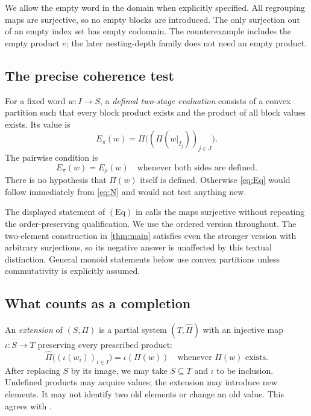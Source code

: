 \documentclass[11pt,letterpaper]{article}
\numberwithin{equation}{section}
\theoremstyle{definition}
\theoremstyle{remark}
\newcommand{\Eq}{\mathrm{Eq}}
\begin{document}
We allow the empty word in the domain when explicitly specified. All regrouping maps are surjective, so no empty blocks are introduced. The only surjection out of an empty index set has empty codomain. The counterexample includes the empty product $e$; the later nesting-depth family does not need an empty product.

\subsection{The precise coherence test}
For a fixed word $w:I\to S$, a \emph{defined two-stage evaluation} consists of a convex partition such that every block product exists and the product of all block values exists. Its value is
\begin{equation}\label{eq:two-stage}
E_\pi(w)=\Pi\bigl((\Pi(w|_{I_j}))_{j\in J}\bigr).
\end{equation}
The pairwise condition is
\begin{equation}\label{eq:Eq}
E_\pi(w)=E_\rho(w)
\quad\text{whenever both sides are defined}. \tag{Eq}
\end{equation}
There is no hypothesis that $\Pi(w)$ itself is defined. Otherwise \eqref{eq:Eq} would follow immediately from \eqref{eq:N} and would not test anything new.

The displayed statement of $(\Eq)$ in \cite[Remark~7.1(b)]{LippariniNIS} calls the maps surjective without repeating the order-preserving qualification. We use the ordered version throughout. The two-element construction in \cref{thm:main} satisfies even the stronger version with arbitrary surjections, so its negative answer is unaffected by this textual distinction. General monoid statements below use convex partitions unless commutativity is explicitly assumed.

\subsection{What counts as a completion}
An \emph{extension} of $(S,\Pi)$ is a partial system $(T,\widehat\Pi)$ with an injective map $\iota:S\to T$ preserving every prescribed product:
\[
\widehat\Pi\bigl((\iota(w_i))_{i\in I}\bigr)=\iota(\Pi(w))
\quad\text{whenever }\Pi(w)\text{ exists}.
\]
After replacing $S$ by its image, we may take $S\subseteq T$ and $\iota$ to be inclusion. Undefined products may acquire values; the extension may introduce new elements. It may not identify two old elements or change an old value. This agrees with \cite[Definition~3.8]{LippariniNIS}.
\end{document}
